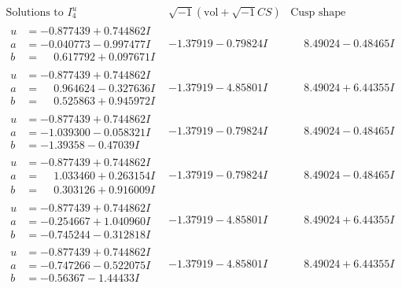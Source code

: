 \documentclass[1p]{elsarticle_modified}
\theoremstyle{definition}
\newcommand{\I}{\sqrt{-1}}
\begin{document}
$$\begin{array}{c|c|c}  
\text{Solutions to }I^u_{4}& \I (\text{vol} + \sqrt{-1}CS) & \text{Cusp shape}\\
 \hline 
\begin{aligned}
u &= -0.877439 + 0.744862 I \\
a &= -0.040773 - 0.997477 I \\
b &= \phantom{-}0.617792 + 0.097671 I\end{aligned}
 & -1.37919 - 0.79824 I & \phantom{-}8.49024 - 0.48465 I \\ \hline\begin{aligned}
u &= -0.877439 + 0.744862 I \\
a &= \phantom{-}0.964624 - 0.327636 I \\
b &= \phantom{-}0.525863 + 0.945972 I\end{aligned}
 & -1.37919 - 4.85801 I & \phantom{-}8.49024 + 6.44355 I \\ \hline\begin{aligned}
u &= -0.877439 + 0.744862 I \\
a &= -1.039300 - 0.058321 I \\
b &= -1.39358 - 0.47039 I\end{aligned}
 & -1.37919 - 0.79824 I & \phantom{-}8.49024 - 0.48465 I \\ \hline\begin{aligned}
u &= -0.877439 + 0.744862 I \\
a &= \phantom{-}1.033460 + 0.263154 I \\
b &= \phantom{-}0.303126 + 0.916009 I\end{aligned}
 & -1.37919 - 0.79824 I & \phantom{-}8.49024 - 0.48465 I \\ \hline\begin{aligned}
u &= -0.877439 + 0.744862 I \\
a &= -0.254667 + 1.040960 I \\
b &= -0.745244 - 0.312818 I\end{aligned}
 & -1.37919 - 4.85801 I & \phantom{-}8.49024 + 6.44355 I \\ \hline\begin{aligned}
u &= -0.877439 + 0.744862 I \\
a &= -0.747266 - 0.522075 I \\
b &= -0.56367 - 1.44433 I\end{aligned}
 & -1.37919 - 4.85801 I & \phantom{-}8.49024 + 6.44355 I \\ \hline\begin{aligned}

\end{aligned}
\end{array}$$
\end{document}

